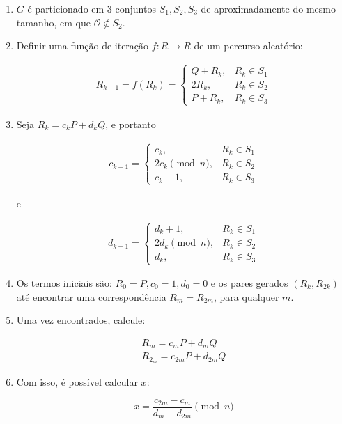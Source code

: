 \begin{enumerate}
\item \(G\) é particionado em 3 conjuntos $S_1, S_2, S_3$ de aproximadamente do mesmo tamanho, em que $\mathcal{O} \notin S_2$.
\item Definir uma função de iteração $f : R \to R$ de um percurso aleatório:

\begin{eqnarray} \label{eq:walk}
R_{k+1} = f(R_k) =
\begin{cases}
Q + R_k, &R_k \in S_1 \\
2R_k, &R_k \in S_2 \\
P + R_k, &R_k \in S_3
\end{cases}
\end{eqnarray}

\item Seja $R_k = c_kP + d_kQ$, e portanto

\begin{eqnarray}
c_{k+1} =
\begin{cases}
c_k, &R_k \in S_1 \\
2c_k \pmod n, &R_k \in S_2 \\
c_k + 1, &R_k \in S_3
\end{cases}
\end{eqnarray}

e

\begin{eqnarray}
d_{k+1} =
\begin{cases}
d_k + 1, &R_k \in S_1 \\
2d_k \pmod n, &R_k \in S_2 \\
d_k, &R_k \in S_3
\end{cases}
\end{eqnarray}

\item Os termos iniciais são: $R_0 = P, c_0 = 1, d_0 = 0$ e os pares gerados $(R_k, R_{2k})$ até encontrar uma correspondência $R_m = R_{2m}$, para qualquer \(m\).

\item Uma vez encontrados, calcule:

\begin{eqnarray*}
R_m = c_mP + d_mQ \\
R_{2_m} = c_{2m}P + d_{2m}Q
\end{eqnarray*}

\item Com isso, é possível calcular \(x\):

\begin{equation} \label{eq:x}
x = \frac{c_{2m} - c_m}{d_m - d_{2m}} \pmod n
\end{equation}

\end{enumerate}


